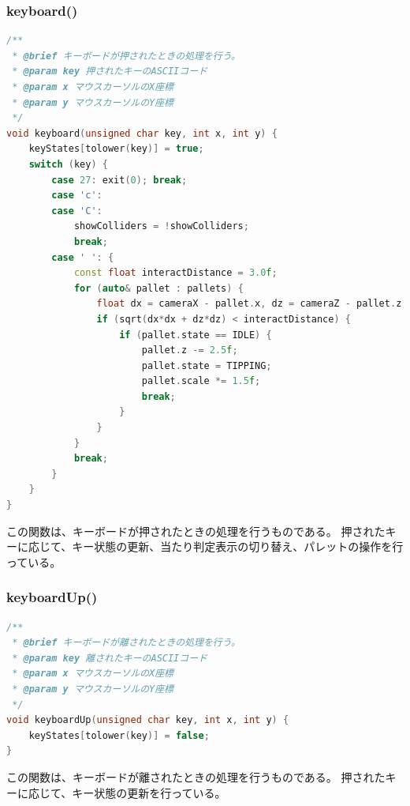 \documentclass[uplatex,dvipdfmx,a4paper]{jsarticle}
\begin{document}
\hypertarget{func:keyboard}{}\subsubsection{keyboard()}\label{func:keyboard}
\begin{lstlisting}[language=C++, caption={keyboard() 関数}, label={lst:keyboard_detail}]
/**
 * @brief キーボードが押されたときの処理を行う。
 * @param key 押されたキーのASCIIコード
 * @param x マウスカーソルのX座標
 * @param y マウスカーソルのY座標
 */
void keyboard(unsigned char key, int x, int y) {
    keyStates[tolower(key)] = true;
    switch (key) {
        case 27: exit(0); break;
        case 'c':
        case 'C':
            showColliders = !showColliders;
            break;
        case ' ': {
            const float interactDistance = 3.0f;
            for (auto& pallet : pallets) {
                float dx = cameraX - pallet.x, dz = cameraZ - pallet.z;
                if (sqrt(dx*dx + dz*dz) < interactDistance) {
                    if (pallet.state == IDLE) {
                        pallet.z -= 2.5f;
                        pallet.state = TIPPING;
                        pallet.scale *= 1.5f;
                        break;
                    }
                }
            }
            break;
        }
    }
}
\end{lstlisting}
この関数は、キーボードが押されたときの処理を行うものである。
押されたキーに応じて、キー状態の更新、当たり判定表示の切り替え、パレットの操作を行っている。

\hypertarget{func:keyboardUp}{}\subsubsection{keyboardUp()}\label{func:keyboardUp}
\begin{lstlisting}[language=C++, caption={keyboardUp() 関数}, label={lst:keyboardUp_detail}]
/**
 * @brief キーボードが離されたときの処理を行う。
 * @param key 離されたキーのASCIIコード
 * @param x マウスカーソルのX座標
 * @param y マウスカーソルのY座標
 */
void keyboardUp(unsigned char key, int x, int y) {
    keyStates[tolower(key)] = false;
}
\end{lstlisting}
この関数は、キーボードが離されたときの処理を行うものである。
押されたキーに応じて、キー状態の更新を行っている。
\end{document}

